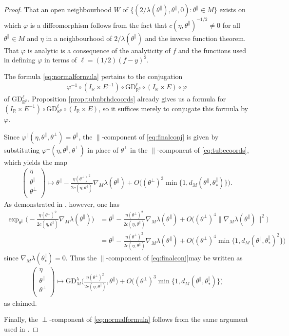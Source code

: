\documentclass{article}
\newcommand{\RB}{\mathbb{R}}
\newcommand{\tpa}{\theta^{\parallel}}
\newcommand{\tpe}{\theta^{\perp}}
\newcommand{\GD}{\mathrm{GD}}
\theoremstyle{plain}
\theoremstyle{definition}
\theoremstyle{remark}
\begin{document}
\begin{proof}
    That an open neighbourhood $W$ of $\{(2/\lambda(\tpa),\tpa,0):\tpa\in M\}$ exists on which $\varphi$ is a diffeomorphism follows from the fact that $c(\eta,\tpa)^{-1/2}\neq 0$ for all $\tpa\in M$ and $\eta$ in a neighbourhood of $2/\lambda(\tpa)$ and the inverse function theorem. That $\varphi$ is analytic is a consequence of the analyticity of $f$ and the functions used in defining $\varphi$ in terms of $\ell = (1/2)(f-y)^2$.

    The formula \eqref{eq:normalformula} pertains to the conjugation
    \begin{align}
        \varphi^{-1}\circ(I_{\RB}\times E^{-1})\circ\GD^{\ell}_{\RB^p}\circ (I_{\RB}\times E)\circ\varphi\label{eq:finalconj}
    \end{align}
    of $\GD^{\ell}_{\RB^p}$. Proposition \ref{prop:tubnbrhdcoords} already gives us a formula for $(I_{\RB}\times E^{-1})\circ \GD^{\ell}_{\RB^p}\circ (I_{\RB}\times E)$, so it suffices merely to conjugate this formula by $\varphi$.
    
    Since $\varphi^{\parallel}(\eta,\tpa,\tpe) = \tpa$, the $\parallel$-component of \eqref{eq:finalconj} is given by substituting $\varphi^{\perp}(\eta,\tpa,\tpe)$ in place of $\tpe$ in the $\parallel$-component of \eqref{eq:tubecoords}, which yields the map
    \begin{align}
        \begin{pmatrix}
            \eta\\\tpa \\ \tpe \\
        \end{pmatrix}\mapsto \tpa - \frac{\eta(\tpe)^2}{2c(\eta,\tpa)}\nabla_M\lambda(\tpa) + O\big((\tpe)^3\min\{1,d_M(\tpa,\tpa_*)\}\big).
    \end{align}
    As demonstrated in \cite{monera2014taylor}, however, one has
    \begin{align}
        \exp_{\tpa}\bigg(-\frac{\eta(\tpe)^2}{2c(\eta,\tpa)}\nabla_M\lambda(\tpa)\bigg) &= \tpa - \frac{\eta(\tpe)^2}{2c(\eta,\tpa)}\nabla_M\lambda(\tpa) + O\big((\tpe)^4\|\nabla_M\lambda(\tpa)\|^2\big)\\&=\tpa-\frac{\eta(\tpe)^2}{2c(\eta,\tpa)}\nabla_M\lambda(\tpa) + O\big((\tpe)^4\min\{1,d_M(\tpa,\tpa_*)^2\}\big)
    \end{align}
    since $\nabla_M\lambda(\tpa_*) = 0$. Thus the $\parallel$-component of \eqref{eq:finalconj}may be written as
    \begin{align}
        \begin{pmatrix}
            \eta \\\tpa \\ \tpe \\
        \end{pmatrix}\mapsto \GD^{\lambda}_M\bigg(\frac{\eta(\tpe)^2}{2c(\eta,\tpa)},\tpa\bigg) + O\big((\tpe)^3\min\{1,d_M(\tpa,\tpa_*)\}\big)
    \end{align}
    as claimed.
    
    Finally, the $\perp$-component of \eqref{eq:normalformula} follows from the same argument used in \cite[Theorem 4.3]{kuznetsov}.
\end{proof}
\end{document}
